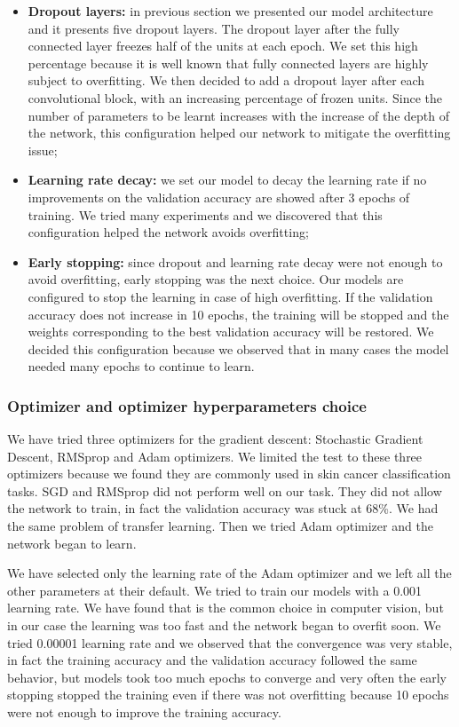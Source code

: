 			\begin{itemize}
				\item \textbf{Dropout layers:} in previous section we presented our model architecture and it presents five dropout layers. The dropout layer after the fully connected layer freezes half of the units at each epoch. We set this high percentage because it is well known that fully connected layers are highly subject to overfitting. We then decided to add a dropout layer after each convolutional block, with an increasing percentage of frozen units. Since the number of parameters to be learnt increases with the increase of the depth of the network, this configuration helped our network to mitigate the overfitting issue;
				\item \textbf{Learning rate decay:} we set our model to decay the learning rate if no improvements on the validation accuracy are showed after 3 epochs of training. We tried many experiments and we discovered that this configuration helped the network avoids overfitting;
				\item \textbf{Early stopping:} since dropout and learning rate decay were not enough to avoid overfitting, early stopping was the next choice. Our models are configured to stop the learning in case of high overfitting. If the validation accuracy does not increase in 10 epochs, the training will be stopped and the weights corresponding to the best validation accuracy will be restored. We decided this configuration because we observed that in many cases the model needed many epochs to continue to learn.
			\end{itemize}
		
		\subsubsection{Optimizer and optimizer hyperparameters choice}
			
			We have tried three optimizers for the gradient descent: Stochastic Gradient Descent, RMSprop and Adam optimizers. We limited the test to these three optimizers because we found they are commonly used in skin cancer classification tasks. SGD and RMSprop did not perform well on our task. They did not allow the network to train, in fact the validation accuracy was stuck at 68\%. We had the same problem of transfer learning. Then we tried Adam optimizer and the network began to learn.
			
			\smallskip
			
			We have selected only the learning rate of the Adam optimizer and we left all the other parameters at their default. We tried to train our models with a 0.001 learning rate. We have found that is the common choice in computer vision, but in our case the learning was too fast and the network began to overfit soon. We tried 0.00001 learning rate and we observed that the convergence was very stable, in fact the training accuracy and the validation accuracy followed the same behavior, but models took too much epochs to converge and very often the early stopping stopped the training even if there was not overfitting because 10 epochs were not enough to improve the training accuracy.
			
